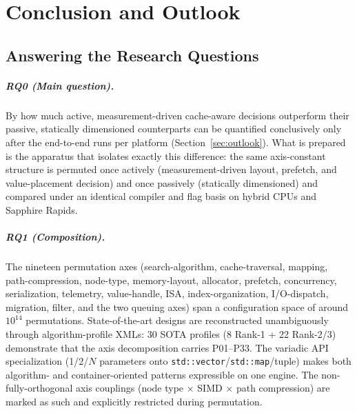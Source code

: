 \chapter{Conclusion and Outlook}\label{ch:conclusion}

\section{Answering the Research Questions}\label{sec:answers}

\paragraph{RQ0 (Main question).} By how much active, measurement-driven cache-aware decisions
outperform their passive, statically dimensioned counterparts can be quantified conclusively only
after the end-to-end runs per platform (Section~\ref{sec:outlook}). What is prepared is the
apparatus that isolates exactly this difference: the same axis-constant structure is permuted once
actively (measurement-driven layout, prefetch, and value-placement decision) and once passively
(statically dimensioned) and compared under an identical compiler and flag basis on hybrid CPUs and
Sapphire Rapids.

\paragraph{RQ1 (Composition).} The nineteen permutation axes (search-algorithm,
cache-traversal, mapping, path-compression, node-type, memory-layout, allocator, prefetch,
concurrency, serialization, telemetry, value-handle, ISA, index-organization, I/O-dispatch,
migration, filter, and the two queuing axes) span a configuration space of around $10^{14}$
permutations. State-of-the-art designs are reconstructed unambiguously through algorithm-profile
XMLs: 30 SOTA profiles (8 Rank-1 + 22 Rank-2/3) demonstrate that the axis decomposition carries
P01--P33. The variadic API specialization (1/2/$N$ parameters onto
\texttt{std::vector}/\texttt{std::map}/tuple) makes both algorithm- and container-oriented patterns
expressible on one engine. The non-fully-orthogonal axis couplings (node type $\times$ SIMD $\times$
path compression) are marked as such and explicitly restricted during permutation.

